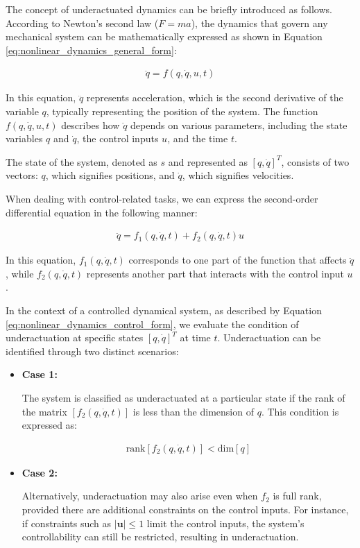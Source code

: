 The concept of underactuated dynamics can be briefly introduced as follows. According to Newton's second law (\( F = ma \)), the dynamics that govern any mechanical system can be mathematically expressed as shown in Equation \ref{eq:nonlinear_dynamics_general_form}:

\begin{align}
    \ddot{q} = f(q, \dot{q}, u, t)
    \label{eq:nonlinear_dynamics_general_form}
\end{align}

In this equation, \( \ddot{q} \) represents acceleration, which is the second derivative of the variable \( q \), typically representing the position of the system. The function \( f(q, \dot{q}, u, t) \) describes how \( \ddot{q} \) depends on various parameters, including the state variables \( q \) and \( \dot{q} \), the control inputs \( u \), and the time \( t \).

The state of the system, denoted as \( s \) and represented as \( [q, \dot{q}]^T \), consists of two vectors: \( q \), which signifies positions, and \( \dot{q} \), which signifies velocities.

When dealing with control-related tasks, we can express the second-order differential equation in the following manner:

\begin{align}
    \ddot{q} = f_1(q, \dot{q}, t) + f_2(q, \dot{q}, t)u
    \label{eq:nonlinear_dynamics_control_form}
\end{align}

In this equation, \( f_1(q, \dot{q}, t) \) corresponds to one part of the function that affects \( \ddot{q} \), while \( f_2(q, \dot{q}, t) \) represents another part that interacts with the control input \( u \).

In the context of a controlled dynamical system, as described by Equation \ref{eq:nonlinear_dynamics_control_form}, we evaluate the condition of underactuation at specific states \([q, \dot{q}]^T\) at time \(t\). Underactuation can be identified through two distinct scenarios:

\begin{itemize}
 \item \textbf{Case 1:}
 
 The system is classified as underactuated at a particular state if the rank of the matrix \([f_2(q, \dot{q}, t)]\) is less than the dimension of \(q\). This condition is expressed as:
 
 \begin{align}
    \text{rank}[f_2(q, \dot{q}, t)] < \text{dim}[q]
\end{align}
 
 \item \textbf{Case 2:} 
 
 Alternatively, underactuation may also arise even when \(f_2\) is full rank, provided there are additional constraints on the control inputs. For instance, if constraints such as \(|\mathbf{u}| \leq 1\) limit the control inputs, the system's controllability can still be restricted, resulting in underactuation.
\end{itemize}

